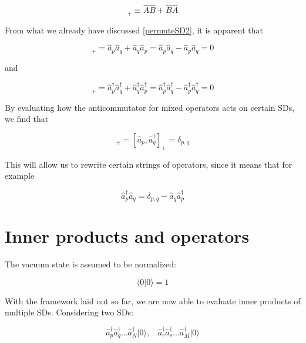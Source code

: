 \begin{equation}
[\hat{A}, \hat{B}]_+ \equiv \hat{A}\hat{B} + \hat{B}\hat{A}
\label{eqn:anticommutator}
\end{equation}

From what we already have discussed \ref{permuteSD2}, it is apparent that 

\begin{equation}
[\hat{a}_p, \hat{a}_q]_+ = \hat{a}_p\hat{a}_q + \hat{a}_q\hat{a}_p = \hat{a}_p\hat{a}_q - \hat{a}_p\hat{a}_q = 0
\label{eqn:anticommutator_aa}
\end{equation}

and

\begin{equation}
[\hat{a}_p^\dagger, \hat{a}_q^\dagger]_+ = \hat{a}_p^\dagger\hat{a}_q^\dagger + \hat{a}_q^\dagger\hat{a}_p^\dagger = \hat{a}_p^\dagger\hat{a}_q^\dagger - \hat{a}_p^\dagger\hat{a}_q^\dagger = 0
\label{eqn:anticommutator_cc}
\end{equation}

By evaluating how the anticommutator for mixed operators acts on certain SDs, we find that

\begin{equation}
[\hat{a}_p^\dagger, \hat{a}_q]_+ = [\hat{a}_p, \hat{a}_q^\dagger]_+ = \delta_{p,q}
\label{eqb:anticommutator_ca_ac}
\end{equation}

This will allow us to rewrite certain strings of operators, since it means that for example

\begin{equation}
\hat{a}_p^\dagger \hat{a}_q = \delta_{p,q} -  \hat{a}_q \hat{a}_p^\dagger
\label{eqn:anticommutator_ca_ac2}
\end{equation}

\section{Inner products and operators}

The vacuum state is assumed to be normalized:

\begin{equation}
\langle 0 \vert 0 \rangle = 1
\label{eqn:vacuuminner}
\end{equation}

With the framework laid out so far, we are now able to evaluate inner products of multiple SDs. Considering two SDs:

\begin{equation}
\hat{a}_p^\dagger \hat{a}_q^\dagger  ... \hat{a}_N^\dagger \vert 0 \rangle, \: \: \: \:
\hat{a}_r^\dagger \hat{a}_s^\dagger  ... \hat{a}_M^\dagger \vert 0 \rangle
\label{eqn:sd12}
\end{equation}

